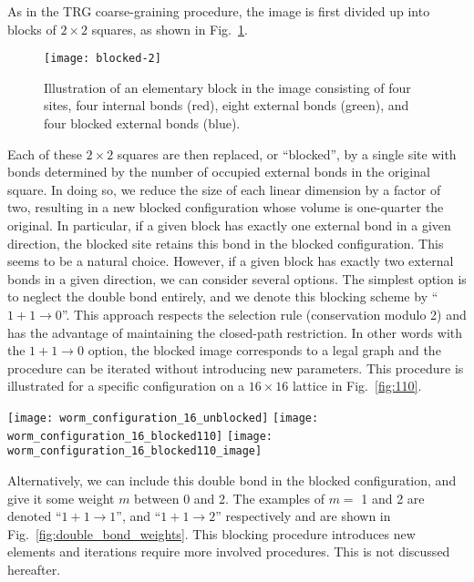 \documentclass[../main.tex]{subfiles}
\begin{document}
As in the TRG coarse-graining procedure, the image is first divided up into blocks of $2\times2$ squares, as shown in
Fig.~\ref{fig:blocked-2}.
%
\begin{figure}[htpb]
    \centering
    \texttt{[image: blocked-2]}
    \caption{Illustration of an elementary block in the image consisting of
        four sites, four internal bonds (red), eight external bonds (green), and
    four blocked external bonds (blue).}%
\label{fig:blocked-2}
\end{figure}
%
Each of these $2\times2$ squares are then replaced, or ``blocked'', by a single
site with bonds determined by the number of occupied external bonds in the
original square.  In doing so, we reduce the size of each linear dimension by a
factor of two, resulting in a new blocked configuration whose volume is
one-quarter the original. In particular, if a given block has exactly one
external bond in a given direction, the blocked site retains this bond in the
blocked configuration. This seems to be a natural choice. However, if a given
block has exactly two external bonds in a given direction, we can consider
several options. The simplest option is to neglect the double bond entirely,
and we denote this blocking scheme by ``$1+1\rightarrow 0$''. This approach
respects the selection rule (conservation modulo 2) and has the advantage of
maintaining the closed-path restriction. In other words with the
$1+1\rightarrow0$ option, the blocked image corresponds to a legal graph and
the procedure can be iterated without introducing new parameters. This
procedure is illustrated for a specific configuration on a $16\times16$ lattice
in Fig.~\ref{fig:110}.
%
\begin{figure*}[htpb]
    \centering
    \texttt{[image: worm\_configuration\_16\_unblocked]}\hfill%
    \texttt{[image: worm\_configuration\_16\_blocked110]}\hfill%
    \texttt{[image: worm\_configuration\_16\_blocked110\_image]}
    \caption{(a) Illustration of the $1+1\rightarrow 0$ blocking
        procedure discussed in the text: original configuration; (b)
        introduction of the blocks and replacement of single or double bounds
        according to the $1+1\rightarrow 0$ rule; (c) construction of the
    corresponding  blocked image.}%
\label{fig:110}
\end{figure*}
%
Alternatively, we can include this double bond in the blocked configuration,
and give it some weight $m$ between 0 and 2.  The examples of $m=$ 1 and 2 are
denoted ``$1+1\rightarrow 1$'', and ``$1+1\rightarrow 2$'' respectively and are
shown in Fig.~\ref{fig:double_bond_weights}. This blocking procedure introduces
new elements and iterations require more involved procedures. This is not
discussed hereafter. 
\end{document}
